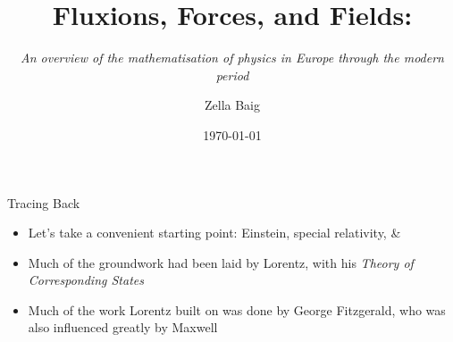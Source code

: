 \documentclass{beamer}
\title{Fluxions, Forces, and Fields:}
\subtitle{\small \emph{An overview of the mathematisation of physics in Europe through the modern period}}
\date{\today}
\author{Zella Baig}
\begin{document}
\maketitle
  \begin{frame}{Tracing Back}
	\begin{itemize}
		\item Let's take a convenient starting point: Einstein, special relativity, \& {\color{mEm}{aether theory}}
		\item Much of the groundwork had been laid by Lorentz, with his \emph{Theory of Corresponding States}{\autocite{specrel}}
	\item Much of the work Lorentz built on was done by George Fitzgerald, who was also influenced greatly by Maxwell
	\end{itemize}
  \end{frame}
\end{document}
